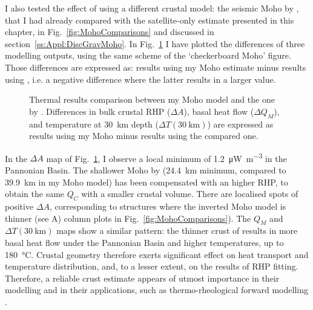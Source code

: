 I also tested the effect of using a different crustal model: the seismic Moho by \textcite{Grad2009}, that I had already compared with the satellite-only estimate presented in this chapter, in Fig.~\ref{fig:MohoComparisons} and discussed in section~\ref{ss:Appl:DiscGravMoho}.
In Fig.~\ref{fig:CompGradMoho} I have plotted the differences of three modelling outputs, using the same scheme of the `checkerboard Moho' figure.
Those differences are expressed as: results using my Moho estimate minus results using \textcite{Grad2009}, i.e. a negative difference where the latter results in a larger value.

\begin{figure}
	\begin{adjustbox}{center}
	\end{adjustbox}
	\caption[Thermal results comparison between my Moho model and the one by \textcite{Grad2009}.]{Thermal results comparison between my Moho model and the one by \textcite{Grad2009}. Differences in bulk crustal RHP ($\Delta A$), basal heat flow ($\Delta Q_M$), and temperature at 30~\si{\kilo \metre} depth ($\Delta T(30~\mathrm{km})$) are expressed as results using my Moho minus results using the compared one.}
	\label{fig:CompGradMoho}
\end{figure}

In the $\Delta A$ map of Fig.~\ref{fig:CompGradMoho}, I observe a local minimum of \SI{1.2}{\micro \watt \per \cubic \metre} in the Pannonian Basin.
The shallower Moho by \textcite{Grad2009} (24.4~\si{\kilo \metre} minimum, compared to 39.9~\si{\kilo \metre} in my Moho model) has been compensated with an higher RHP, to obtain the same $Q_C$ with a smaller crustal volume.
There are localised spots of positive $\Delta A$, corresponding to structures where the inverted Moho model is thinner (see A) column plots in Fig.~\ref{fig:MohoComparisons}).
The $Q_M$ and $\Delta T(30~\mathrm{km})$ maps show a similar pattern: the thinner crust of \textcite{Grad2009} results in more basal heat flow under the Pannonian Basin and higher temperatures, up to \SI[retain-explicit-plus]{+180}{\celsius}.
Crustal geometry therefore exerts significant effect on heat transport and temperature distribution, and, to a lesser extent, on the results of RHP fitting.
Therefore, a reliable crust estimate appears of utmost importance in their modelling and in their applications, such as thermo-rheological forward modelling \parencite[e.g. ][]{Burov1995}.


